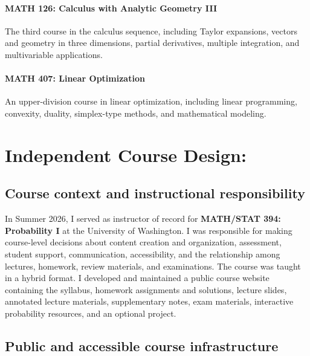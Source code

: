 \documentclass[11pt]{article}
\begin{document}
\paragraph{MATH 126: Calculus with Analytic Geometry III}

The third course in the calculus sequence,
including Taylor expansions,
vectors and geometry in three dimensions,
partial derivatives,
multiple integration,
and multivariable applications.

\paragraph{MATH 407: Linear Optimization}

An upper-division course in linear optimization,
including linear programming,
convexity,
duality,
simplex-type methods,
and mathematical modeling.


\newpage

\section{Independent Course Design:}

\subsection{Course context and instructional responsibility}

In Summer 2026,
I served as instructor of record for
\textbf{MATH/STAT 394: Probability I}
at the University of Washington. I was responsible for making course-level decisions about
content creation and organization,
assessment,
student support,
communication,
accessibility,
and the relationship among lectures,
homework,
review materials,
and examinations. The course was taught in a hybrid
format.
I developed and maintained a public course website containing
the syllabus,
homework assignments and solutions,
lecture slides,
annotated lecture materials,
supplementary notes,
exam materials,
interactive probability resources,
and an optional project.

\subsection{Public and accessible course infrastructure}
\end{document}
